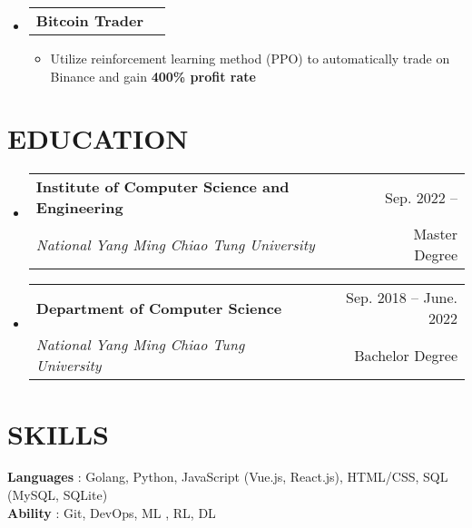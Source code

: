 \documentclass[letterpaper,11pt]{article}
\makeatletter
\newcommand{\resumeItem}[1]{
  \item\small{
    {#1 \vspace{-1pt}}
  }
}
\newcommand{\resumeSubheading}[4]{
  \vspace{-1pt}\item
    \begin{tabular*}{\textwidth}[t]{l@{\extracolsep{\fill}}r}
      \textbf{#1} & {\color{dark-grey}\small #2}\vspace{1pt}\\ %
      \textit{#3} & {\color{dark-grey} \small #4}\\ %
    \end{tabular*}\vspace{-4pt}
}
\newcommand{\resumeProjectHeading}[2]{
    \item
    \begin{tabular*}{\textwidth}{l@{\extracolsep{\fill}}r}
      #1 & {\color{dark-grey}} \\
    \end{tabular*}\vspace{-4pt}
}
\newcommand{\resumeSubHeadingListStart}{\begin{itemize}[leftmargin=0in, label={}]}
\newcommand{\resumeSubHeadingListEnd}{\end{itemize}}
\newcommand{\resumeItemListStart}{\begin{itemize}}
\newcommand{\resumeItemListEnd}{\end{itemize}\vspace{0pt}}
\makeatother
\begin{document}
    \resumeSubHeadingListStart
        \resumeProjectHeading
          {\textbf{Bitcoin Trader} \href{https://arxiv.org/abs/1707.06347}{\faFile}}{}
          \resumeItemListStart
            \resumeItem{Utilize reinforcement learning method (PPO) to automatically trade on Binance and gain \textbf{400\% profit rate} }
          \resumeItemListEnd
    \resumeSubHeadingListEnd



\section {EDUCATION}
  \resumeSubHeadingListStart
  \resumeSubheading
    {Institute of Computer Science and Engineering}{Sep. 2022 -- }
    {National Yang Ming Chiao Tung University}{Master Degree}
  \resumeSubHeadingListEnd
  \resumeSubHeadingListStart
    \resumeSubheading
      {Department of Computer Science}{Sep. 2018 -- June. 2022}
      {National Yang Ming Chiao Tung University}{Bachelor Degree}
  \resumeSubHeadingListEnd


%
\section{SKILLS}
 \begin{itemize}[leftmargin=0in, label={}]
    \small{\item{
     \textbf{Languages} {: Golang, Python, JavaScript (Vue.js, React.js), HTML/CSS, SQL (MySQL, SQLite)}\vspace{2pt} \\
     \textbf{Ability}   {: Git, DevOps, ML , RL, DL}
    }}
 \end{itemize}


\end{document}
